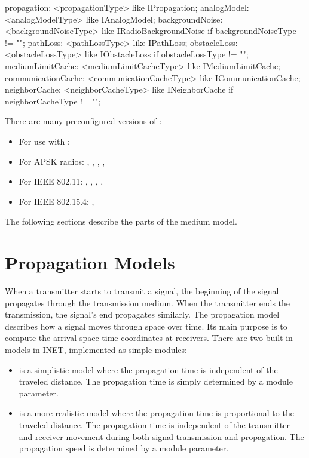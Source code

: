 \begin{ned}
propagation: <propagationType> like IPropagation;
analogModel: <analogModelType> like IAnalogModel;
backgroundNoise: <backgroundNoiseType> like IRadioBackgroundNoise
    if backgroundNoiseType != "";
pathLoss: <pathLossType> like IPathLoss;
obstacleLoss: <obstacleLossType> like IObstacleLoss
    if obstacleLossType != "";
mediumLimitCache: <mediumLimitCacheType> like IMediumLimitCache;
communicationCache: <communicationCacheType> like ICommunicationCache;
neighborCache: <neighborCacheType> like INeighborCache
    if neighborCacheType != "";
\end{ned}

There are many preconfigured versions of :

\begin{itemize}
  \item For use with : 
  \item For APSK radios: , ,
    , ,
  \item For IEEE 802.11: , ,
    , ,
  \item For IEEE 802.15.4: , 
\end{itemize}

The following sections describe the parts of the medium model.

\section{Propagation Models}
\label{sec:medium:propagation-models}

When a transmitter starts to transmit a signal, the beginning of the signal
propagates through the transmission medium. When the transmitter ends the
transmission, the signal's end propagates similarly. The propagation model
describes how a signal moves through space over time. Its main purpose is
to compute the arrival space-time coordinates at receivers. There are two
built-in models in INET, implemented as simple modules:

\begin{itemize}
        \item {} is a simplistic model where the propagation time is independent of the traveled distance. The propagation time is simply determined by a module parameter.
        \item {} is a more realistic model where the propagation time is proportional to the traveled distance. The propagation time is independent of the transmitter and receiver movement during both signal transmission and propagation. The propagation speed is determined by a module parameter.
\end{itemize}

